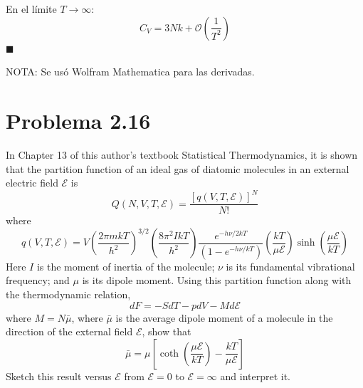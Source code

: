 \documentclass[]{article}
\numberwithin{equation}{section}
\newcommand{\0}{\textcolor{gray}{0}}
\newcommand{\qed}{\hfill\(\blacksquare\)}
\begin{document}
En el límite \(T\rightarrow\infty\):
\begin{equation}
	C_V = 3 N k + \mathcal{O}\left(\frac{1}{T^2}\right)
\end{equation}
\qed

NOTA: Se usó Wolfram Mathematica para las derivadas.

\section{Problema 2.16}
In Chapter 13 of this author's textbook Statistical Thermodynamics, it is shown that the partition function of an ideal gas of diatomic molecules in an external electric field $\mathscr{E}$ is
\begin{equation}
	Q(N, V, T, \mathscr{E})=\frac{[q(V, T, \mathscr{E})]^N}{N!}
\end{equation}
where
\begin{equation}
	q(V, T, \mathscr{E})=V\left(\frac{2 \pi m k T}{h^2}\right)^{3 / 2}\left(\frac{8 \pi^2 I k T}{h^2}\right) \frac{e^{-h \nu / 2 k T}}{\left(1-e^{-h \nu / k T}\right)}\left(\frac{k T}{\mu \mathscr{E}}\right) \sinh \left(\frac{\mu \mathscr{E}}{k T}\right)
\end{equation}
Here $I$ is the moment of inertia of the molecule; $\nu$ is its fundamental vibrational frequency; and $\mu$ is its dipole moment. Using this partition function along with the thermodynamic relation,
\begin{equation}
	d F = -S d T-p d V-M d \mathscr{E}\label{dF_relacion}
\end{equation}
where $M=N \bar{\mu}$, where $\bar{\mu}$ is the average dipole moment of a molecule in the direction of the external field $\mathscr{E}$, show that
\begin{equation}
	\bar{\mu}=\mu\left[\operatorname{coth}\left(\frac{\mu \mathscr{E}}{k T}\right)-\frac{k T}{\mu \mathscr{E}}\right]
\end{equation}
Sketch this result versus $\mathscr{E}$ from $\mathscr{E}=0$ to $\mathscr{E}=\infty$ and interpret it.
\\
\end{document}
